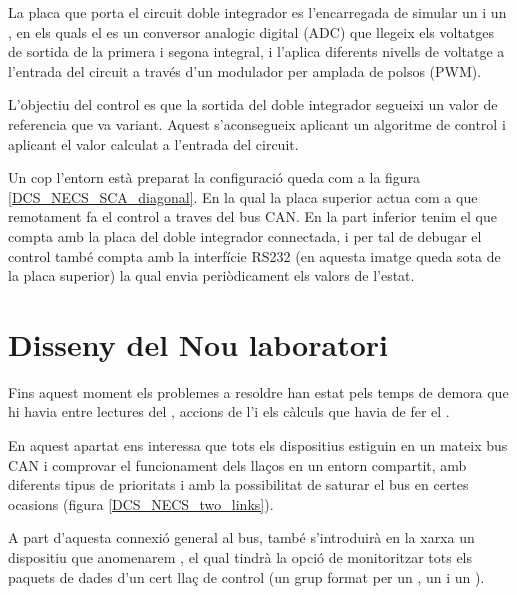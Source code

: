 La placa \FLEX que porta el circuit doble integrador es l'encarregada de simular un \Sensor i un \Actuador, en els quals el \Sensor es un conversor analogic digital (ADC) que llegeix els voltatges de sortida de la primera i segona integral, i l'\Actuador aplica diferents nivells de voltatge a l'entrada del circuit a través d'un modulador per amplada de polsos (PWM).

L'objectiu del control es que la sortida del doble integrador segueixi un valor de referencia que va variant. Aquest s'aconsegueix aplicant un algoritme de control i aplicant el valor calculat a l'entrada del circuit.

Un cop l'entorn està preparat la configuració queda com a la figura \ref{DCS_NECS_SCA_diagonal}. En la qual la placa superior actua com a \Controlador que remotament fa el control a traves del bus CAN. En la part inferior tenim el \SensorActuador que compta amb la placa del doble integrador connectada, i per tal de debugar el control també compta amb la interfície RS232 (en aquesta imatge queda sota de la placa superior) la qual envia periòdicament els valors de l'estat.



\FloatBarrier

\section{Disseny del Nou laboratori}\label{diss:nou}

Fins aquest moment els problemes a resoldre han estat pels temps de demora que hi havia entre lectures del \Sensor, accions de l'\Actuador i els càlculs que havia de fer el \Controlador.

En aquest apartat ens interessa que tots els dispositius estiguin en un mateix bus CAN i comprovar el funcionament dels llaços en un entorn compartit, amb diferents tipus de prioritats i amb la possibilitat de saturar el bus en certes ocasions (figura \ref{DCS_NECS_two_links}).

A part d'aquesta connexió general al bus, també s'introduirà en la xarxa un dispositiu que anomenarem \Monitor, el qual tindrà la opció de monitoritzar tots els paquets de dades d'un cert llaç de control (un grup format per un \Sensor, un \Actuador i un \Controlador).

